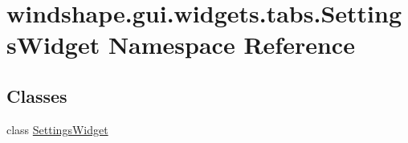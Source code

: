 \hypertarget{namespacewindshape_1_1gui_1_1widgets_1_1tabs_1_1_settings_widget}{}\section{windshape.\+gui.\+widgets.\+tabs.\+Settings\+Widget Namespace Reference}
\label{namespacewindshape_1_1gui_1_1widgets_1_1tabs_1_1_settings_widget}
\subsection*{Classes}
\begin{DoxyCompactItemize}
\item 
class \mbox{\hyperlink{classwindshape_1_1gui_1_1widgets_1_1tabs_1_1_settings_widget_1_1_settings_widget}{Settings\+Widget}}
\end{DoxyCompactItemize}
